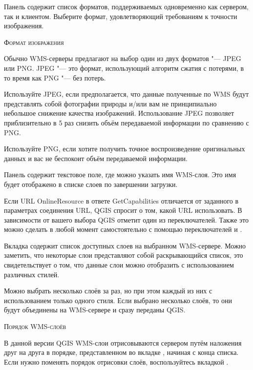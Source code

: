 
Панель  содержит список форматов,
поддерживаемых одновременно как сервером, так и клиентом.
Выберите формат, удовлетворяющий требованиям к точности изображения.

\begin{Tip}[ht]\caption{\textsc{Формат изображения}}
Обычно WMS-серверы предлагают на выбор один из двух форматов "--- JPEG или PNG.
JPEG "--- это формат, использующий алгоритм сжатия с потерями, в то время
как PNG "--- без потерь.

Используйте JPEG, если предполагается, что данные полученные по WMS
будут представлять собой фотографии природы и/или вам не принципиально
небольшое снижение качества изображений. Использование JPEG позволяет
приблизительно в 5 раз снизить объём передаваемой информации по сравнению
с PNG.

Используйте PNG, если хотите получить точное воспроизведение оригинальных
данных и вас не беспокоит объём передаваемой информации. 
\end{Tip}


Панель содержит текстовое поле, где можно указать имя
WMS-слоя. Это имя будет отображено в списке слоев по завершении загрузки.

Если URL OnlineResource в ответе GetCapabilities отличается от заданного в
параметрах соединения URL, QGIS спросит о том, какой URL использовать.
В зависимости от вашего выбора QGIS отметит один из переключателей. Также это
можно сделать в любой момент самостоятельно с помощью переключателей
 и .

 \label{ogc-wms-layers}

Вкладка  содержит список доступных слоев на выбранном WMS-сервере.
Можно заметить, что некоторые слои представляют собой раскрывающийся список,
это свидетельствует о том, что данные слои можно отобразить с использованием
различных стилей.

Можно выбрать несколько слоёв за раз, но при этом каждый из них с
использованием только одного стиля. Если выбрано несколько слоёв, то
они будут объединены на WMS-сервере и сразу переданы QGIS.

\begin{Tip}[ht]\caption{\textsc{Порядок WMS-слоёв}}
В данной версии QGIS WMS-слои отрисовываются сервером путём наложения
друг на друга в порядке, представленном во вкладке , начиная с конца
списка. Если нужно поменять порядок отрисовки слоёв, воспользуйтесь вкладкой
.
\end{Tip}

